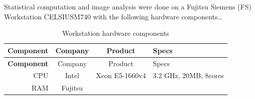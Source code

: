 \documentclass[11pt,singlespacinge,twoside]{reedthesis} %
\theoremstyle{definition}
\theoremstyle{definition}
\theoremstyle{definition}
\theoremstyle{remark}
\begin{document}
Statistical computation and image analysis were done on a Fujitsu Siemens (FS) Workstation CELSIUSM740 with the following hardware components\ldots{}
\begin{longtable}[]{@{}rccl@{}}
\caption{\label{tab:PCcomp} Workstation hardware components}\tabularnewline
\toprule
\begin{minipage}[b]{0.19\columnwidth}\raggedleft
\textbf{Component}\strut
\end{minipage} & \begin{minipage}[b]{0.20\columnwidth}\centering
Company\strut
\end{minipage} & \begin{minipage}[b]{0.22\columnwidth}\centering
Product\strut
\end{minipage} & \begin{minipage}[b]{0.28\columnwidth}\raggedright
Specs\strut
\end{minipage}\tabularnewline
\midrule
\endfirsthead
\toprule
\begin{minipage}[b]{0.19\columnwidth}\raggedleft
\textbf{Component}\strut
\end{minipage} & \begin{minipage}[b]{0.20\columnwidth}\centering
Company\strut
\end{minipage} & \begin{minipage}[b]{0.22\columnwidth}\centering
Product\strut
\end{minipage} & \begin{minipage}[b]{0.28\columnwidth}\raggedright
Specs\strut
\end{minipage}\tabularnewline
\midrule
\endhead
\begin{minipage}[t]{0.19\columnwidth}\raggedleft
CPU\strut
\end{minipage} & \begin{minipage}[t]{0.20\columnwidth}\centering
Intel\strut
\end{minipage} & \begin{minipage}[t]{0.22\columnwidth}\centering
Xeon E5-1660v4\strut
\end{minipage} & \begin{minipage}[t]{0.28\columnwidth}\raggedright
3.2 GHz, 20MB, 8cores\strut
\end{minipage}\tabularnewline
\begin{minipage}[t]{0.19\columnwidth}\raggedleft
RAM\strut
\end{minipage} & \begin{minipage}[t]{0.20\columnwidth}\centering
Fujitsu\strut

\end{minipage}
\end{longtable}
\end{document}
